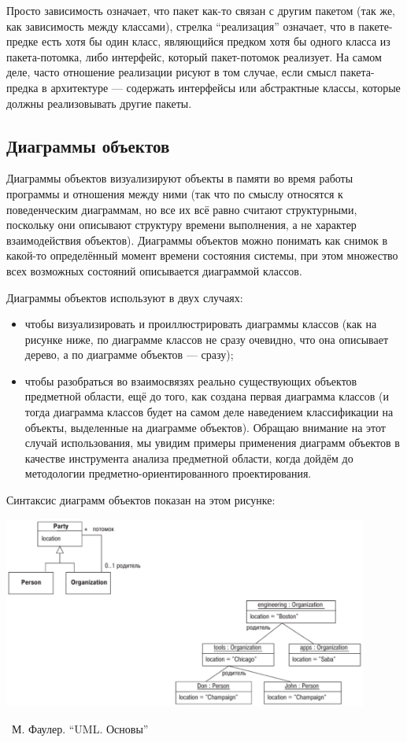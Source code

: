 \documentclass[a5paper]{article}
\newcommand{\attribution}[1] {
	\vspace{-5mm}\begin{flushright}\begin{scriptsize}%
	{\textcopyright\, #1}\end{scriptsize}\end{flushright}
}
\begin{document}
Просто зависимость означает, что пакет как-то связан с другим пакетом (так же, как зависимость между классами), стрелка ``реализация'' означает, что в пакете-предке есть хотя бы один класс, являющийся предком хотя бы одного класса из пакета-потомка, либо интерфейс, который пакет-потомок реализует. На самом деле, часто отношение реализации рисуют в том случае, если смысл пакета-предка в архитектуре --- содержать интерфейсы или абстрактные классы, которые должны реализовывать другие пакеты.

\subsection{Диаграммы объектов}

Диаграммы объектов визуализируют объекты в памяти во время работы программы и отношения между ними (так что по смыслу относятся к поведенческим диаграммам, но все их всё равно считают структурными, поскольку они описывают структуру времени выполнения, а не характер взаимодействия объектов). Диаграммы объектов можно понимать как снимок в какой-то определённый момент времени состояния системы, при этом множество всех возможных состояний описывается диаграммой классов.

Диаграммы объектов используют в двух случаях:

\begin{itemize}
	\item чтобы визуализировать и проиллюстрировать диаграммы классов (как на рисунке ниже, по диаграмме классов не сразу очевидно, что она описывает дерево, а по диаграмме объектов --- сразу);
	\item чтобы разобраться во взаимосвязях реально существующих объектов предметной области, ещё до того, как создана первая диаграмма классов (и тогда диаграмма классов будет на самом деле наведением классификации на объекты, выделенные на диаграмме объектов). Обращаю внимание на этот случай использования, мы увидим примеры применения диаграмм объектов в качестве инструмента анализа предметной области, когда дойдём до методологии предметно-ориентированного проектирования.
\end{itemize}

Синтаксис диаграмм объектов показан на этом рисунке:

\begin{center}
	\includegraphics[width=0.9\textwidth]{objectDiagrams.png}
	\attribution{М. Фаулер. ``UML. Основы''}
\end{center}
\end{document}
